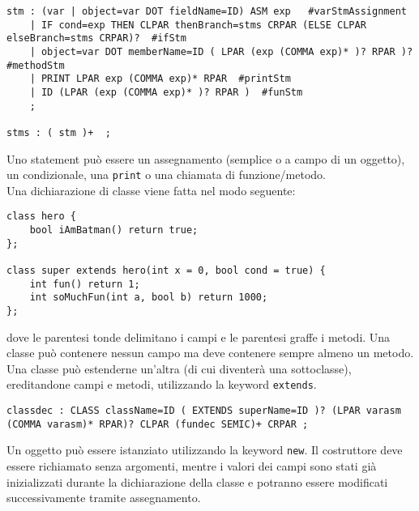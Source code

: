 \documentclass[a4paper]{article}   %
\begin{document}
\begin{lstlisting}[language=ANTLR,basicstyle=\footnotesize\ttfamily]
stm	: (var | object=var DOT fieldName=ID) ASM exp	#varStmAssignment
	| IF cond=exp THEN CLPAR thenBranch=stms CRPAR (ELSE CLPAR elseBranch=stms CRPAR)?	#ifStm
	| object=var DOT memberName=ID ( LPAR (exp (COMMA exp)* )? RPAR )?	#methodStm
	| PRINT LPAR exp (COMMA exp)* RPAR	#printStm
	| ID (LPAR (exp (COMMA exp)* )? RPAR )	#funStm
	;

stms : ( stm )+  ;

\end{lstlisting}
Uno statement può essere un assegnamento (semplice o a campo di un oggetto), un condizionale, una \lstinline|print| o una chiamata di funzione/metodo.\\
\newpage
Una dichiarazione di classe viene fatta nel modo seguente:\\

\begin{lstlisting}[basicstyle=\footnotesize\ttfamily]
class hero {
    bool iAmBatman() return true;
};

class super extends hero(int x = 0, bool cond = true) {
    int fun() return 1;
    int soMuchFun(int a, bool b) return 1000;
};
\end{lstlisting}

dove le parentesi tonde delimitano i campi e le parentesi graffe i metodi. Una classe può contenere nessun campo ma deve contenere sempre almeno un metodo. Una classe può estenderne un'altra (di cui diventerà una sottoclasse), ereditandone campi e metodi, utilizzando la keyword \lstinline[language=ANTLR]|extends|.\\

\begin{lstlisting}[language=ANTLR,basicstyle=\footnotesize\ttfamily]
classdec : CLASS className=ID ( EXTENDS superName=ID )? (LPAR varasm (COMMA varasm)* RPAR)? CLPAR (fundec SEMIC)+ CRPAR ;
\end{lstlisting}

Un oggetto può essere istanziato utilizzando la keyword \lstinline[language=ANTLR]|new|. Il costruttore deve essere richiamato senza argomenti, mentre i valori dei campi sono stati già inizializzati durante la dichiarazione della classe e potranno essere modificati successivamente
tramite assegnamento.\\
\end{document}
